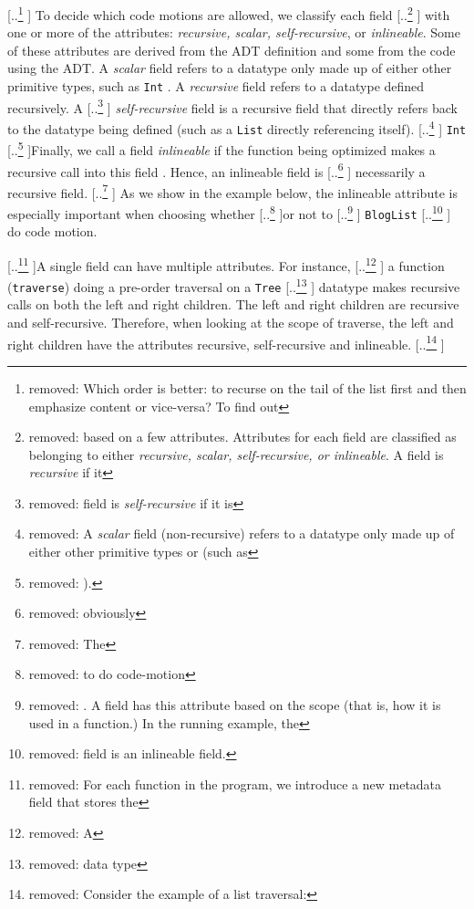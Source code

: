 \documentclass[acmsmall,review,anonymous]{acmart}\settopmatter{printfolios=true,printccs=false,printacmref=false}
\newcommand{\new}[1]{{\color{very-dark-green}{#1}}}
\newcommand{\new}[1]{#1}
\providecommand{\DIFaddtex}[1]{{\protect\color{blue} \sf #1}} %
\providecommand{\DIFdeltex}[1]{{\protect\color{red} [..\footnote{removed: #1} ]}} %
\providecommand{\DIFaddbegin}{} %
\providecommand{\DIFaddend}{} %
\providecommand{\DIFdelbegin}{} %
\providecommand{\DIFdelend}{} %
\providecommand{\DIFadd}[1]{\texorpdfstring{\DIFaddtex{#1}}{#1}} %
\providecommand{\DIFdel}[1]{\texorpdfstring{\DIFdeltex{#1}}{}} %
\newcommand{\DIFscaledelfig}{0.5}
\newlength{\DIFdelgraphicswidth} %
\newlength{\DIFdelgraphicsheight} %
\newcommand{\DIFaddincludegraphics}[2][]{{\color{blue}\fbox{\DIFOincludegraphics[#1]{#2}}}} %
\newcommand{\DIFdelincludegraphics}[2][]{%
\sbox{\DIFdelgraphicsbox}{\DIFOincludegraphics[#1]{#2}}%
\settoboxwidth{\DIFdelgraphicswidth}{\DIFdelgraphicsbox} %
\settoboxtotalheight{\DIFdelgraphicsheight}{\DIFdelgraphicsbox} %
\scalebox{\DIFscaledelfig}{%
\parbox[b]{\DIFdelgraphicswidth}{\usebox{\DIFdelgraphicsbox}\\[-\baselineskip] \rule{\DIFdelgraphicswidth}{0em}}\llap{\resizebox{\DIFdelgraphicswidth}{\DIFdelgraphicsheight}{%
\setlength{\unitlength}{\DIFdelgraphicswidth}%
\begin{picture}(1,1)%
\thicklines\linethickness{2pt} %
{\color[rgb]{1,0,0}\put(0,0){\framebox(1,1){}}}%
{\color[rgb]{1,0,0}\put(0,0){\line( 1,1){1}}}%
{\color[rgb]{1,0,0}\put(0,1){\line(1,-1){1}}}%
\end{picture}%
}\hspace*{3pt}}} %
} %
\DeclareRobustCommand{\DIFaddbegin}{\DIFOaddbegin \let\includegraphics\DIFaddincludegraphics} %
\DeclareRobustCommand{\DIFaddend}{\DIFOaddend \let\includegraphics\DIFOincludegraphics} %
\DeclareRobustCommand{\DIFdelbegin}{\DIFOdelbegin \let\includegraphics\DIFdelincludegraphics} %
\DeclareRobustCommand{\DIFdelend}{\DIFOaddend \let\includegraphics\DIFOincludegraphics} %
\begin{document}
\DIFdelbegin \DIFdel{Which order is better: to recurse on the tail of the list first and then emphasize content
or vice-versa? To find out}\DIFdelend \DIFaddbegin \DIFadd{To decide which code motions are allowed}\DIFaddend , we classify each field \DIFdelbegin \DIFdel{based on a few attributes. Attributes for each field are classified as belonging
to either \textit{recursive, scalar, self-recursive, or inlineable}.
A field is \emph{recursive} if it }\DIFdelend \DIFaddbegin \DIFadd{with one or more of the attributes: \textit{recursive, scalar, self-recursive}, or \textit{inlineable}.
Some of these attributes are derived from the ADT definition and some from the code using the ADT.
A \emph{scalar} field refers to a datatype only made up of either other primitive types, such as }{\color{blue}%
\lstinline|Int|%
}%
\DIFadd{.
A \emph{recursive} field }\DIFaddend refers to a datatype defined recursively.
A \DIFdelbegin \DIFdel{field is \emph{self-recursive} if it is }\DIFdelend \DIFaddbegin \DIFadd{\emph{self-recursive} field is }\DIFaddend a recursive field that directly refers back to the datatype being defined (such as a \lstinline|List| directly referencing itself).
\DIFdelbegin \DIFdel{A \emph{scalar} field (non-recursive) refers to a datatype only made up of either other primitive types or \new{datatypes containing only scalar fields} (such as }%
{\color{red}%
\lstinline|Int|%
}%
\DIFdel{).
}\DIFdelend Finally, we call a field \emph{inlineable} if the function being optimized makes a recursive call into this field \new{(i.e.\ taking the field value as an argument)}.
Hence, an inlineable field is \DIFdelbegin \DIFdel{obviously }\DIFdelend \DIFaddbegin \DIFadd{necessarily }\DIFaddend a recursive field.
\DIFdelbegin \DIFdel{The }\DIFdelend \DIFaddbegin \DIFadd{As we show in the example below, the }\DIFaddend inlineable attribute is \DIFaddbegin \DIFadd{especially }\DIFaddend important when choosing whether \DIFdelbegin \DIFdel{to do code-motion }\DIFdelend or not to \DIFdelbegin \DIFdel{.
A field has this attribute based on the scope (that is, how it is used in a function.)
In the running example, the }%
{\color{red}%
\lstinline|BlogList| %
}%
\DIFdel{field is an inlineable field.
}\DIFdelend \DIFaddbegin \DIFadd{do code motion.
}\DIFaddend 


\DIFdelbegin \DIFdel{For each function in the program, we introduce a new metadata field that stores the \new{attributes for all fields of all data constrcuctors used in that function.}
}\DIFdelend A single field can have multiple attributes.
For instance, \DIFdelbegin \DIFdel{A }\DIFdelend \DIFaddbegin \DIFadd{a }\DIFaddend function (\lstinline|traverse|) doing a pre-order traversal on a \lstinline|Tree| \DIFdelbegin \DIFdel{data type }\DIFdelend \DIFaddbegin \DIFadd{datatype }\DIFaddend makes recursive calls on both the 
left and right children. The left and right children are recursive and self-recursive. Therefore, when looking at the scope of 
traverse, the left and right children have the attributes recursive, self-recursive and inlineable. 
\DIFdelbegin \DIFdel{Consider the example of a list traversal:
}\DIFdelend 
\end{document}
